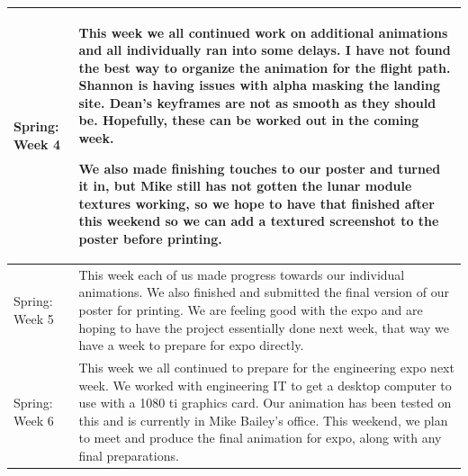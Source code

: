 \documentclass[onecolumn, draftclsnofoot,10pt, compsoc]{IEEEtran}
\begin{document}
\begin{longtable} {|p{1.5cm}|p{13.5cm}|}
Spring: Week 4 & 
This week we all continued work on additional animations and all individually ran into some delays. I have not found the best way to organize the animation for the flight path. Shannon is having issues with alpha masking the landing site. Dean's keyframes are not as smooth as they should be. Hopefully, these can be worked out in the coming week. 

We also made finishing touches to our poster and turned it in, but Mike still has not gotten the lunar module textures working, so we hope to have that finished after this weekend so we can add a textured screenshot to the poster before printing. 
\\ \hline

Spring: Week 5 & 
This week each of us made progress towards our individual animations. We also finished and submitted the final version of our poster for printing. We are feeling good with the expo and are hoping to have the project essentially done next week, that way we have a week to prepare for expo directly. 
\\ \hline

Spring: Week 6 & This week we all continued to prepare for the engineering expo next week. We worked with engineering IT to get a desktop computer to use with a 1080 ti graphics card. Our animation has been tested on this and is currently in Mike Bailey's office. This weekend, we plan to meet and produce the final animation for expo, along with any final preparations. 
\\ \hline

\end{longtable}
\end{document}
